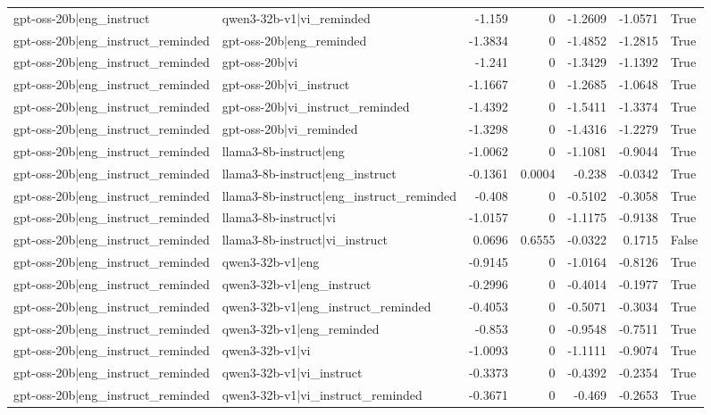 \begin{table}
\begin{tabular}{l l r r r r l}
gpt-oss-20b|eng_instruct & qwen3-32b-v1|vi_reminded & -1.159 & 0 & -1.2609 & -1.0571 & True \\
gpt-oss-20b|eng_instruct_reminded & gpt-oss-20b|eng_reminded & -1.3834 & 0 & -1.4852 & -1.2815 & True \\
gpt-oss-20b|eng_instruct_reminded & gpt-oss-20b|vi & -1.241 & 0 & -1.3429 & -1.1392 & True \\
gpt-oss-20b|eng_instruct_reminded & gpt-oss-20b|vi_instruct & -1.1667 & 0 & -1.2685 & -1.0648 & True \\
gpt-oss-20b|eng_instruct_reminded & gpt-oss-20b|vi_instruct_reminded & -1.4392 & 0 & -1.5411 & -1.3374 & True \\
gpt-oss-20b|eng_instruct_reminded & gpt-oss-20b|vi_reminded & -1.3298 & 0 & -1.4316 & -1.2279 & True \\
gpt-oss-20b|eng_instruct_reminded & llama3-8b-instruct|eng & -1.0062 & 0 & -1.1081 & -0.9044 & True \\
gpt-oss-20b|eng_instruct_reminded & llama3-8b-instruct|eng_instruct & -0.1361 & 0.0004 & -0.238 & -0.0342 & True \\
gpt-oss-20b|eng_instruct_reminded & llama3-8b-instruct|eng_instruct_reminded & -0.408 & 0 & -0.5102 & -0.3058 & True \\
gpt-oss-20b|eng_instruct_reminded & llama3-8b-instruct|vi & -1.0157 & 0 & -1.1175 & -0.9138 & True \\
gpt-oss-20b|eng_instruct_reminded & llama3-8b-instruct|vi_instruct & 0.0696 & 0.6555 & -0.0322 & 0.1715 & False \\
gpt-oss-20b|eng_instruct_reminded & qwen3-32b-v1|eng & -0.9145 & 0 & -1.0164 & -0.8126 & True \\
gpt-oss-20b|eng_instruct_reminded & qwen3-32b-v1|eng_instruct & -0.2996 & 0 & -0.4014 & -0.1977 & True \\
gpt-oss-20b|eng_instruct_reminded & qwen3-32b-v1|eng_instruct_reminded & -0.4053 & 0 & -0.5071 & -0.3034 & True \\
gpt-oss-20b|eng_instruct_reminded & qwen3-32b-v1|eng_reminded & -0.853 & 0 & -0.9548 & -0.7511 & True \\
gpt-oss-20b|eng_instruct_reminded & qwen3-32b-v1|vi & -1.0093 & 0 & -1.1111 & -0.9074 & True \\
gpt-oss-20b|eng_instruct_reminded & qwen3-32b-v1|vi_instruct & -0.3373 & 0 & -0.4392 & -0.2354 & True \\
gpt-oss-20b|eng_instruct_reminded & qwen3-32b-v1|vi_instruct_reminded & -0.3671 & 0 & -0.469 & -0.2653 & True \\

\end{tabular}
\end{table}
